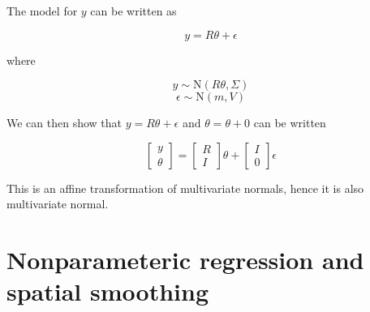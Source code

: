 \documentclass[10pt]{article}
\begin{document}
\begin{enumerate}[label=(\Alph*)]
        The model for $y$ can be written as

        $$y = R \theta + \epsilon$$

        where

        $$y \sim \text{N}(R\theta, \Sigma)$$
        $$\epsilon \sim \text{N}(m, V)$$

        We can then show that $y = R \theta + \epsilon$ and $\theta = \theta + 0$ can be written

        $$\begin{bmatrix} y \\ \theta \end{bmatrix} = \begin{bmatrix} R \\ I \end{bmatrix} \theta + \begin{bmatrix} I \\ 0 \end{bmatrix} \epsilon$$

        This is an affine transformation of multivariate normals, hence it is also multivariate normal.

        \end{enumerate}

    \section*{Nonparameteric regression and spatial smoothing}
\end{document}
